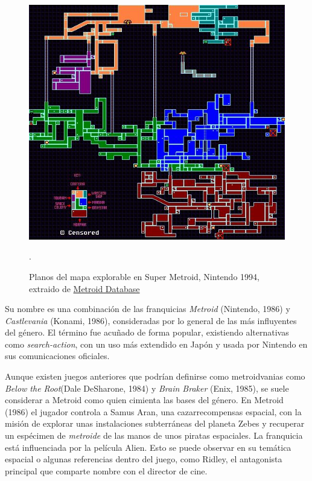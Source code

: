 \begin{figure}[h]
    \centering
    \includegraphics[scale=2.0]{img/smetrmap.jpg}
    \caption[Planos del mapa explorable en Super Metroid]{Planos del mapa explorable en Super Metroid, Nintendo 1994, extraido de \href{https://metroiddatabase.com/maps/}{Metroid Database}}.
    \label{fig:supermetroidmap}
\end{figure}

Su nombre es una combinación de las franquicias \textit{Metroid} (Nintendo, 1986) y \textit{Castlevania} (Konami, 1986), consideradas por lo general de las más influyentes del género. El término fue acuñado de forma popular, existiendo alternativas como \textit{search-action}, con un uso más extendido en Japón y usada por Nintendo en sus comunicaciones oficiales.

Aunque existen juegos anteriores que podrían definirse como metroidvanias como \textit{Below the Root}(Dale DeSharone, 1984) y \textit{Brain Braker} (Enix, 1985), se suele considerar a Metroid como quien cimienta las bases del género. En Metroid (1986) el jugador controla a Samus Aran, una cazarrecompensas espacial, con la misión de explorar unas instalaciones subterráneas del planeta Zebes y recuperar un espécimen de \textit{metroide} de las manos de unos piratas espaciales. La franquicia está influenciada por la película Alien. Esto se puede observar en su temática espacial o algunas referencias dentro del juego, como Ridley, el antagonista principal que comparte nombre con el director de cine.

